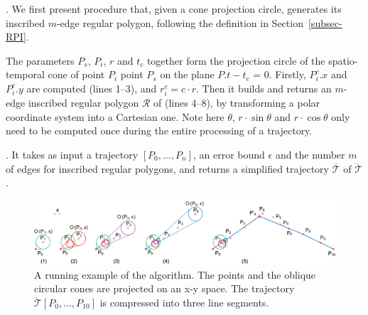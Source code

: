 .
We first present procedure  that, given a cone projection circle, generates its inscribed $m$-edge regular polygon,  following the definition in Section~\ref{subsec-RPI}.

The parameters $P_s$, $P_i$, $r$ and $t_c$ together form the projection circle  of the spatio-temporal cone  of point $P_{i}$ \wrt point $P_s$ on the plane $P.t - t_c$ = $0$. Firstly, $P^c_i.x$ and $P^c_i.y$ are computed (lines 1--3), and $r^c_i = c\cdot r$.
Then it builds and returns an $m$-edge inscribed regular polygon $\mathcal{R}$ of  (lines 4--8), by transforming a polar coordinate system
into a Cartesian one. Note here $\theta$, $r\cdot\sin\theta$ and $r\cdot\cos\theta$ only need to be computed once during the entire processing of a trajectory.


.
It takes as input a trajectory ${[P_0, \ldots, P_n]}$, an error bound $\epsilon$ and the number $m$ of edges for inscribed regular polygons, and returns a simplified  trajectory $\overline{\mathcal{T}}$ of $\dddot{\mathcal{T}}$.

\begin{figure}[tb!]
	\centering
	\includegraphics[scale=0.79]{figures/Fig-Conesta.png}
	\caption{\small A running example of the \cista algorithm. The points and the oblique circular cones are projected on an x-y space. The trajectory $\dddot{\mathcal{T}}[P_0, \ldots, P_{10}]$ is compressed into three line segments.}
	\label{fig:exm-consta}
\end{figure}


